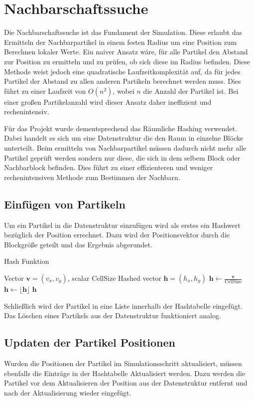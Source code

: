 \documentclass[a4paper, 12pt]{article}
\begin{document}
\section{Nachbarschaftssuche} \label{Kap:NachbarschaftsSuche}
Die Nachbarschaftssuche ist das Fundament der Simulation. Diese erlaubt das Ermitteln der Nachbarpartikel in einem festen Radius um eine Position zum Berechnen lokaler Werte. Ein naiver Ansatz wäre, für alle Partikel den Abstand zur Position zu ermitteln und zu prüfen, ob sich diese im Radius befinden. Diese Methode weist jedoch eine quadratische Laufzeitkomplexität auf, da für jedes Partikel der Abstand zu allen anderen Partikeln berechnet werden muss. Dies führt zu einer Laufzeit von $O(n^2)$, wobei $n$ die Anzahl der Partikel ist. Bei einer großen Partikelanzahl wird dieser Ansatz daher ineffizient und rechenintensiv.

Für das Projekt wurde dementsprechend das Räumliche Hashing verwendet. Dabei handelt es sich um eine Datenstruktur die den Raum in einzelne Blöcke unterteilt. Beim ermitteln von Nachbarpartikel müssen dadurch nicht mehr alle Partikel geprüft werden sondern nur diese, die sich in dem selbem Block oder Nachbarblock befinden. Dies führt zu einer effizienteren und weniger rechenintensiven Methode zum Bestimmen der Nachbarn.

\subsection{Einfügen von Partikeln}
Um ein Partikel in die Datenstruktur einzufügen wird als erstes ein Hashwert bezüglich der Position errechnet. Dazu wird der Positionsvektor durch die Blockgröße geteilt und das Ergebnis abgerundet.
\begin{algorithm}[H]
	\caption{Hash Funktion}
	\begin{algorithmic}[1]
		\Require Vector $\mathbf{v} = (v_x, v_y)$, scalar $\text{CellSize}$
		\Ensure Hashed vector $\mathbf{h} = (h_x, h_y)$
		\State $\mathbf{h} \leftarrow \frac{\mathbf{v}}{\text{CellSize}}$
		\State $\mathbf{h} \leftarrow \lfloor \mathbf{h} \rfloor$
		\Return $\mathbf{h}$
	\end{algorithmic}
\end{algorithm}

Schließlich wird der Partikel in eine Liste innerhalb der Hashtabelle eingefügt. Das Löschen eines Partikels aus der Datenstruktur funktioniert analog.

\subsection{Updaten der Partikel Positionen}
Wurden die Positionen der Partikel im Simulationsschritt aktualisiert, müssen ebenfalls die Einträge in der Hashtabelle Aktualisiert werden. Dazu werden die Partikel vor dem Aktualisieren der Position aus der Datenstruktur entfernt und nach der Aktualisierung wieder eingefügt. 
\end{document}
